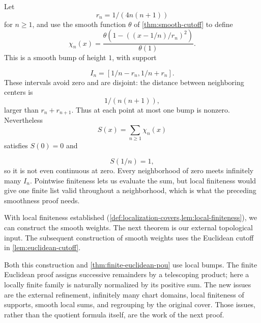 \begin{example}
Let
\[
r_n=1/(4n(n+1))
\]
 for $n\geq1$, and use the smooth function
$\theta$ of \cref{thm:smooth-cutoff} to define
\[
\chi_n(x)=\frac{\theta(1-((x-1/n)/r_n)^2)}{\theta(1)}.
\]
This is a smooth bump of height $1$, with support

\[
I_n=[1/n-r_n,1/n+r_n].
\]
 These intervals avoid zero and are disjoint:
the distance between neighboring centers is
\[
1/(n(n+1)),
\]
 larger than
$r_n+r_{n+1}$. Thus at each point at most one bump is nonzero.
Nevertheless
\[
S(x)=\sum_{n\geq1}\chi_n(x)
\]
 satisfies $S(0)=0$ and

\[
S(1/n)=1,
\]
 so it is not even continuous at zero. Every neighborhood of
zero meets infinitely many $I_n$. Pointwise finiteness lets us evaluate
the sum, but local finiteness would give one finite list valid throughout
a neighborhood, which is what the preceding smoothness proof needs.
\end{example}

With local finiteness established (\cref{def:localization-covers,lem:local-finiteness}),
we can construct the smooth weights. The next
theorem is our external topological input. The subsequent construction of
smooth weights uses the Euclidean cutoff in \cref{lem:euclidean-cutoff}.

Both this construction and \cref{thm:finite-euclidean-pou} use local
bumps. The finite Euclidean proof assigns successive remainders by a
telescoping product; here a locally finite family is naturally normalized
by its positive sum.
The new issues are the external refinement, infinitely many chart domains,
local finiteness of supports, smooth local sums, and regrouping by the
original cover. Those issues, rather than the quotient formula itself,
are the work of the next proof.


